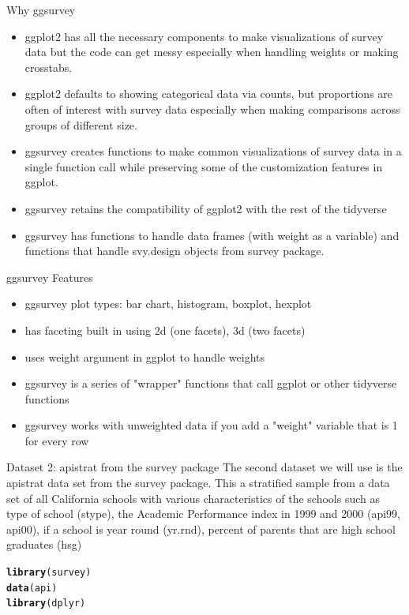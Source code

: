 \documentclass{beamer}\usepackage[]{graphicx}\usepackage[]{xcolor}
\makeatletter
\newcommand{\hlstd}[1]{\textcolor[rgb]{0.345,0.345,0.345}{#1}}%
\newcommand{\hlkwd}[1]{\textcolor[rgb]{0.737,0.353,0.396}{\textbf{#1}}}%
\newenvironment{kframe}{%
 \def\at@end@of@kframe{}%
 \ifinner\ifhmode%
  \def\at@end@of@kframe{\end{minipage}}%
  \begin{minipage}{\columnwidth}%
 \fi\fi%
 \def\FrameCommand##1{\hskip\@totalleftmargin \hskip-\fboxsep
 \colorbox{shadecolor}{##1}\hskip-\fboxsep
     \hskip-\linewidth \hskip-\@totalleftmargin \hskip\columnwidth}%
 \MakeFramed {\advance\hsize-\width
   \@totalleftmargin\z@ \linewidth\hsize
   \@setminipage}}%
 {\par\unskip\endMakeFramed%
 \at@end@of@kframe}
\newenvironment{knitrout}{}{} %
\makeatother
\begin{document}
\begin{frame}[fragile]{Why ggsurvey}
\begin{itemize}
\item ggplot2 has all the necessary components to make visualizations of survey data but the code can get messy especially when handling weights or making crosstabs.
\item ggplot2 defaults to showing categorical data via counts, but proportions are often of interest with survey data especially when making comparisons across groups of different size.
\item ggsurvey creates functions to make common visualizations of survey data in a single function call while preserving some of the customization features in ggplot.
\item ggsurvey retains the compatibility of ggplot2 with the rest of the tidyverse
\item ggsurvey has functions to handle data frames (with weight as a variable) and functions that handle svy.design objects from survey package.
\end{itemize}
\end{frame}

\begin{frame}{ggsurvey Features}
\begin{itemize}
\item ggsurvey plot types: bar chart, histogram, boxplot, hexplot
\item has faceting built in using 2d (one facets), 3d (two facets)
\item uses weight argument in ggplot to handle weights
\item ggsurvey is a series of "wrapper" functions that call ggplot or other tidyverse functions
\item ggsurvey works with unweighted data if you add a "weight" variable that is 1 for every row
\end{itemize}
\end{frame}

\begin{frame}[fragile]{Dataset 2: apistrat from the survey package}
The second dataset we will use is the apistrat data set from the survey package.  This a stratified sample from a data set of all California schools with various characteristics of the schools such as type of school (stype), the Academic Performance index in 1999 and 2000 (api99, api00), if a school is year round (yr.rnd), percent of parents that are high school graduates (hsg)
\begin{knitrout}
\color{fgcolor}\begin{kframe}
\begin{alltt}
\hlkwd{library}\hlstd{(survey)}
\hlkwd{data}\hlstd{(api)}
\hlkwd{library}\hlstd{(dplyr)}
\end{alltt}
\end{kframe}
\end{knitrout}
\end{frame}
\end{document}
